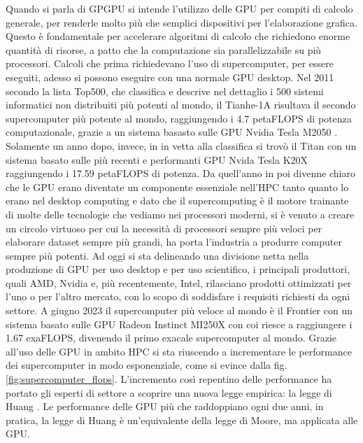 Quando si parla di \gls{GPGPU} si intende l'utilizzo delle GPU per compiti di calcolo generale, per renderle molto più che semplici dispositivi per l'elaborazione grafica. Questo è fondamentale per accelerare algoritmi di calcolo che richiedono enorme quantità di risorse, a patto che la computazione sia parallelizzabile su più processori.
Calcoli che prima richiedevano l'uso di supercomputer, per essere eseguiti, adesso si possono eseguire con una normale GPU desktop. 
Nel 2011 secondo la lista Top500, che classifica e descrive nel dettaglio i 500 sistemi informatici non distribuiti più potenti al mondo, il Tianhe-1A risultava il secondo supercomputer più potente al mondo, raggiungendo i 4.7 petaFLOPS di potenza computazionale, grazie a un sistema basasto sulle GPU Nvidia Tesla M2050 \cite[]{Tianhe-1A:link}. Solamente un anno dopo, invece, in in vetta alla classifica si trovò il Titan \cite[]{Titan:link} con un sistema basato sulle più recenti e performanti GPU Nvida Tesla K20X raggiungendo i 17.59 petaFLOPS di potenza.
Da quell'anno in poi divenne chiaro che le GPU erano diventate un componente essenziale nell'HPC tanto quanto lo erano nel desktop computing e dato che il supercomputing è il motore trainante di molte delle tecnologie che vediamo nei processori moderni, si è venuto a creare un circolo virtuoso per cui la necessità di processori sempre più veloci per elaborare dataset sempre più grandi, ha porta l'industria a produrre computer sempre più potenti. Ad oggi si sta delineando una divisione netta nella produzione di GPU per uso desktop e per uso scientifico, i principali produttori, quali AMD, Nvidia e, più recentemente, Intel, rilasciano prodotti ottimizzati per l'uno o per l'altro mercato, con lo scopo di soddisfare i requisiti richiesti da ogni settore. A giugno 2023 il supercomputer più veloce al mondo è il Frontier \cite[]{Frontier:link} con un sistema basato sulle GPU Radeon Instinct MI250X con coi riesce a raggiungere i 1.67 exaFLOPS, divenendo il primo exacale supercomputer al mondo. Grazie all'uso delle GPU in ambito HPC si sta riuscendo a incrementare le performance dei supercomputer in modo esponenziale, come si evince dalla fig. \ref{fig:supercomputer_flops}. L'incremento così repentino delle performance ha portato gli esperti di settore a scoprire una nuova legge empirica: la legge di Huang \cite[]{Huang:law}. Le performance delle GPU più che raddoppiano ogni due anni, in pratica, la legge di Huang è un'equivalente della legge di Moore, ma applicata alle GPU.

